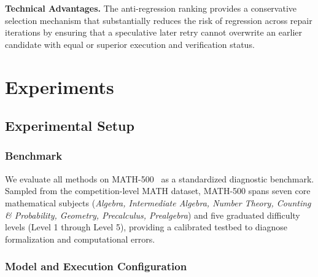 \documentclass[runningheads]{llncs}
\begin{document}
\textbf{Technical Advantages.} The anti-regression ranking provides a conservative selection mechanism that substantially reduces the risk of regression across repair iterations by ensuring that a speculative later retry cannot overwrite an earlier candidate with equal or superior execution and verification status.

\section{Experiments}
\label{sec:experiments}

\subsection{Experimental Setup}

\subsubsection{Benchmark}

We evaluate all methods on MATH-500~\cite{lightman2024verify,hendrycks2021math} as a standardized diagnostic benchmark. Sampled from the competition-level MATH dataset, MATH-500 spans seven core mathematical subjects (\textit{Algebra, Intermediate Algebra, Number Theory, Counting \& Probability, Geometry, Precalculus, Prealgebra}) and five graduated difficulty levels (Level 1 through Level 5), providing a calibrated testbed to diagnose formalization and computational errors.

\subsubsection{Model and Execution Configuration}
\end{document}
